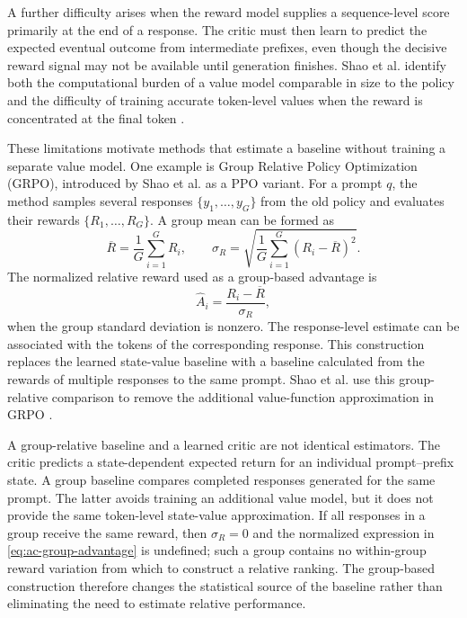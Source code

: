 A further difficulty arises when the reward model supplies a sequence-level
score primarily at the end of a response. The critic must then learn to
predict the expected eventual outcome from intermediate prefixes, even
though the decisive reward signal may not be available until generation
finishes. Shao et al. identify both the computational burden of a
value model comparable in size to the policy and the difficulty of
training accurate token-level values when the reward is concentrated at
the final token \parencite{shao2024deepseekmath}.

These limitations motivate methods that estimate a baseline without
training a separate value model. One example is Group Relative Policy
Optimization (GRPO), introduced by Shao et al. as a PPO variant. For a
prompt \(q\), the method samples several responses
\(\{y_1,\ldots,y_G\}\) from the old policy and evaluates their rewards
\(\{R_1,\ldots,R_G\}\). A group mean can be formed as
\begin{equation}
    \overline{R}
    =
    \frac{1}{G}\sum_{i=1}^{G}R_i,
    \qquad
    \sigma_R
    =
    \sqrt{
        \frac{1}{G}
        \sum_{i=1}^{G}(R_i-\overline{R})^2
    }.
    \label{eq:ac-group-statistics}
\end{equation}
The normalized relative reward used as a group-based advantage is
\begin{equation}
    \widehat{A}_i
    =
    \frac{R_i-\overline{R}}{\sigma_R},
    \label{eq:ac-group-advantage}
\end{equation}
when the group standard deviation is nonzero. The response-level estimate
can be associated with the tokens of the corresponding response. This
construction replaces the learned state-value baseline with a baseline
calculated from the rewards of multiple responses to the same prompt.
Shao et al. use this group-relative comparison to remove the additional
value-function approximation in GRPO \parencite{shao2024deepseekmath}.

A group-relative baseline and a learned critic are not identical
estimators. The critic predicts a state-dependent expected return for an
individual prompt--prefix state. A group baseline compares completed
responses generated for the same prompt. The latter avoids training an
additional value model, but it does not provide the same token-level
state-value approximation. If all responses in a group receive the same
reward, then \(\sigma_R=0\) and the normalized expression in
\cref{eq:ac-group-advantage} is undefined; such a group contains no
within-group reward variation from which to construct a relative ranking.
The group-based construction therefore changes the statistical source of
the baseline rather than eliminating the need to estimate relative
performance.

